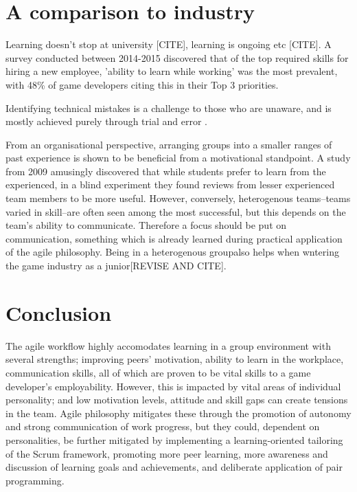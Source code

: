 \documentclass{scrartcl}
\begin{document}
\section{A comparison to industry}
Learning doesn't stop at university [CITE], learning is ongoing etc [CITE]. A survey conducted between 2014-2015 discovered that of the top required skills for hiring a new employee, 'ability to learn while working' \cite{devstudy} was the most prevalent, with 48\% of game developers citing this in their Top 3 priorities.


Identifying technical mistakes is a challenge to those who are unaware, and is mostly achieved purely through trial and error \cite{capstone}. 

From an organisational perspective, arranging groups into a smaller ranges of past experience is shown to be beneficial from a motivational standpoint. A study from 2009 \cite{peerreview} amusingly discovered that while students prefer to learn from the experienced, in a blind experiment they found reviews from lesser experienced team members to be more useful.\cite{peerreview} However, conversely, heterogenous teams--teams varied in skill--are often seen among the most successful, but this depends on the team's ability to communicate. \cite{group2003} Therefore a focus should be put on communication, something which is already learned during practical application of the agile philosophy. Being in a heterogenous groupalso helps when wntering the game industry as a junior[REVISE AND CITE].

\section{Conclusion}
The agile workflow highly accomodates learning in a group environment with several strengths; improving peers' motivation, ability to learn in the workplace, communication skills, all of which are proven to be vital skills to a game developer's employability. However, this is impacted by vital areas of individual personality; and low motivation levels, attitude and skill gaps can create tensions in the team. Agile philosophy mitigates these through the promotion of autonomy and strong communication of work progress, but they could, dependent on personalities, be further mitigated by implementing a learning-oriented tailoring of the Scrum framework, promoting more peer learning, more awareness and discussion of learning goals and achievements, and deliberate application of pair programming.
\end{document}
